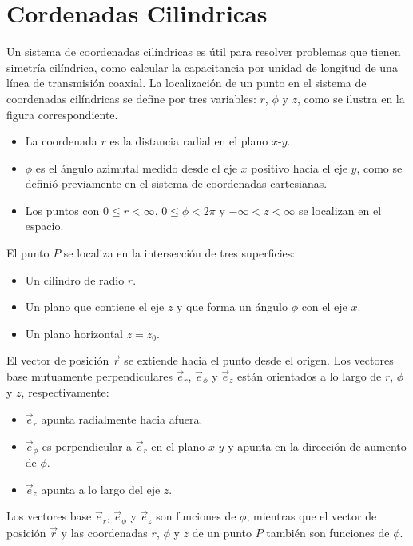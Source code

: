 \section{Cordenadas Cilindricas}
Un sistema de coordenadas cilíndricas es útil para resolver problemas que tienen simetría cilíndrica, como calcular la capacitancia por unidad de longitud de una línea de transmisión coaxial. La localización de un punto en el sistema de coordenadas cilíndricas se define por tres variables: \( r \), \( \phi \) y \( z \), como se ilustra en la figura correspondiente.

\begin{itemize}
    \item La coordenada \( r \) es la distancia radial en el plano \( x\text{-}y \).
    \item \( \phi \) es el ángulo azimutal medido desde el eje \( x \) positivo hacia el eje \( y \), como se definió previamente en el sistema de coordenadas cartesianas.
    \item Los puntos con \( 0 \leq r < \infty \), \( 0 \leq \phi < 2\pi \) y \( -\infty < z < \infty \) se localizan en el espacio.
\end{itemize}

El punto \( P \) se localiza en la intersección de tres superficies:
\begin{itemize}
    \item Un cilindro de radio \( r \).
    \item Un plano que contiene el eje \( z \) y que forma un ángulo \( \phi \) con el eje \( x \).
    \item Un plano horizontal \( z = z_0 \).
\end{itemize}

El vector de posición \( \vec{r} \) se extiende hacia el punto desde el origen. Los vectores base mutuamente perpendiculares \( \vec{e}_r \), \( \vec{e}_\phi \) y \( \vec{e}_z \) están orientados a lo largo de \( r \), \( \phi \) y \( z \), respectivamente:
\begin{itemize}
    \item \( \vec{e}_r \) apunta radialmente hacia afuera.
    \item \( \vec{e}_\phi \) es perpendicular a \( \vec{e}_r \) en el plano \( x\text{-}y \) y apunta en la dirección de aumento de \( \phi \).
    \item \( \vec{e}_z \) apunta a lo largo del eje \( z \).
\end{itemize}
Los vectores base \( \vec{e}_r \), \( \vec{e}_\phi \) y \( \vec{e}_z \) son funciones de \( \phi \), mientras que el vector de posición \( \vec{r} \) y las coordenadas \( r \), \( \phi \) y \( z \) de un punto \( P \) también son funciones de \( \phi \).
